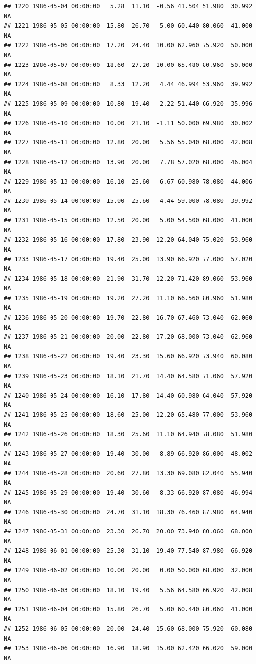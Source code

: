 \documentclass{article}\usepackage{graphicx, color}
\makeatletter
\newenvironment{kframe}{%
 \def\at@end@of@kframe{}%
 \ifinner\ifhmode%
  \def\at@end@of@kframe{\end{minipage}}%
  \begin{minipage}{\columnwidth}%
 \fi\fi%
 \def\FrameCommand##1{\hskip\@totalleftmargin \hskip-\fboxsep
 \colorbox{shadecolor}{##1}\hskip-\fboxsep
     \hskip-\linewidth \hskip-\@totalleftmargin \hskip\columnwidth}%
 \MakeFramed {\advance\hsize-\width
   \@totalleftmargin\z@ \linewidth\hsize
   \@setminipage}}%
 {\par\unskip\endMakeFramed%
 \at@end@of@kframe}
\newenvironment{knitrout}{}{} %
\makeatother
\begin{document}
\begin{knitrout}
\begin{kframe}
\begin{verbatim}
## 1220 1986-05-04 00:00:00   5.28  11.10  -0.56 41.504 51.980  30.992     NA
## 1221 1986-05-05 00:00:00  15.80  26.70   5.00 60.440 80.060  41.000     NA
## 1222 1986-05-06 00:00:00  17.20  24.40  10.00 62.960 75.920  50.000     NA
## 1223 1986-05-07 00:00:00  18.60  27.20  10.00 65.480 80.960  50.000     NA
## 1224 1986-05-08 00:00:00   8.33  12.20   4.44 46.994 53.960  39.992     NA
## 1225 1986-05-09 00:00:00  10.80  19.40   2.22 51.440 66.920  35.996     NA
## 1226 1986-05-10 00:00:00  10.00  21.10  -1.11 50.000 69.980  30.002     NA
## 1227 1986-05-11 00:00:00  12.80  20.00   5.56 55.040 68.000  42.008     NA
## 1228 1986-05-12 00:00:00  13.90  20.00   7.78 57.020 68.000  46.004     NA
## 1229 1986-05-13 00:00:00  16.10  25.60   6.67 60.980 78.080  44.006     NA
## 1230 1986-05-14 00:00:00  15.00  25.60   4.44 59.000 78.080  39.992     NA
## 1231 1986-05-15 00:00:00  12.50  20.00   5.00 54.500 68.000  41.000     NA
## 1232 1986-05-16 00:00:00  17.80  23.90  12.20 64.040 75.020  53.960     NA
## 1233 1986-05-17 00:00:00  19.40  25.00  13.90 66.920 77.000  57.020     NA
## 1234 1986-05-18 00:00:00  21.90  31.70  12.20 71.420 89.060  53.960     NA
## 1235 1986-05-19 00:00:00  19.20  27.20  11.10 66.560 80.960  51.980     NA
## 1236 1986-05-20 00:00:00  19.70  22.80  16.70 67.460 73.040  62.060     NA
## 1237 1986-05-21 00:00:00  20.00  22.80  17.20 68.000 73.040  62.960     NA
## 1238 1986-05-22 00:00:00  19.40  23.30  15.60 66.920 73.940  60.080     NA
## 1239 1986-05-23 00:00:00  18.10  21.70  14.40 64.580 71.060  57.920     NA
## 1240 1986-05-24 00:00:00  16.10  17.80  14.40 60.980 64.040  57.920     NA
## 1241 1986-05-25 00:00:00  18.60  25.00  12.20 65.480 77.000  53.960     NA
## 1242 1986-05-26 00:00:00  18.30  25.60  11.10 64.940 78.080  51.980     NA
## 1243 1986-05-27 00:00:00  19.40  30.00   8.89 66.920 86.000  48.002     NA
## 1244 1986-05-28 00:00:00  20.60  27.80  13.30 69.080 82.040  55.940     NA
## 1245 1986-05-29 00:00:00  19.40  30.60   8.33 66.920 87.080  46.994     NA
## 1246 1986-05-30 00:00:00  24.70  31.10  18.30 76.460 87.980  64.940     NA
## 1247 1986-05-31 00:00:00  23.30  26.70  20.00 73.940 80.060  68.000     NA
## 1248 1986-06-01 00:00:00  25.30  31.10  19.40 77.540 87.980  66.920     NA
## 1249 1986-06-02 00:00:00  10.00  20.00   0.00 50.000 68.000  32.000     NA
## 1250 1986-06-03 00:00:00  18.10  19.40   5.56 64.580 66.920  42.008     NA
## 1251 1986-06-04 00:00:00  15.80  26.70   5.00 60.440 80.060  41.000     NA
## 1252 1986-06-05 00:00:00  20.00  24.40  15.60 68.000 75.920  60.080     NA
## 1253 1986-06-06 00:00:00  16.90  18.90  15.00 62.420 66.020  59.000     NA

\end{verbatim}
\end{kframe}
\end{knitrout}
\end{document}
